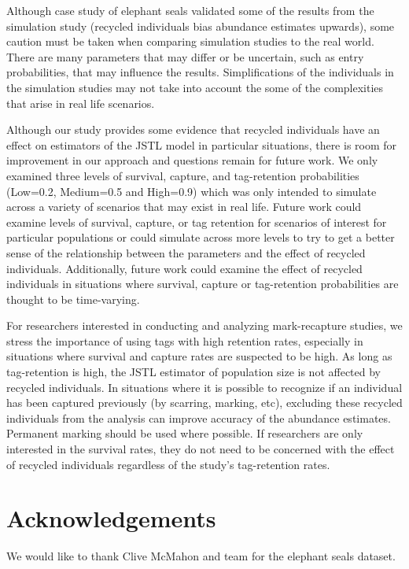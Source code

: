 \documentclass[]{article}
\begin{document}
Although case study of elephant seals validated some of the results from
the simulation study (recycled individuals bias abundance estimates
upwards), some caution must be taken when comparing simulation studies
to the real world. There are many parameters that may differ or be
uncertain, such as entry probabilities, that may influence the results.
Simplifications of the individuals in the simulation studies may not
take into account the some of the complexities that arise in real life
scenarios.

Although our study provides some evidence that recycled individuals have
an effect on estimators of the JSTL model in particular situations,
there is room for improvement in our approach and questions remain for
future work. We only examined three levels of survival, capture, and
tag-retention probabilities (Low=0.2, Medium=0.5 and High=0.9) which was
only intended to simulate across a variety of scenarios that may exist
in real life. Future work could examine levels of survival, capture, or
tag retention for scenarios of interest for particular populations or
could simulate across more levels to try to get a better sense of the
relationship between the parameters and the effect of recycled
individuals. Additionally, future work could examine the effect of
recycled individuals in situations where survival, capture or
tag-retention probabilities are thought to be time-varying.

For researchers interested in conducting and analyzing mark-recapture
studies, we stress the importance of using tags with high retention
rates, especially in situations where survival and capture rates are
suspected to be high. As long as tag-retention is high, the JSTL
estimator of population size is not affected by recycled individuals. In
situations where it is possible to recognize if an individual has been
captured previously (by scarring, marking, etc), excluding these
recycled individuals from the analysis can improve accuracy of the
abundance estimates. Permanent marking should be used where possible. If
researchers are only interested in the survival rates, they do not need
to be concerned with the effect of recycled individuals regardless of
the study's tag-retention rates.

\section{Acknowledgements}\label{acknowledgements}

We would like to thank Clive McMahon and team for the elephant seals
dataset.
\end{document}
